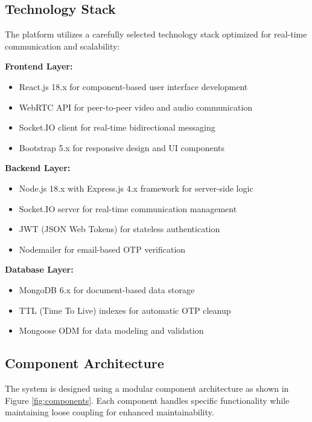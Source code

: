 \documentclass[conference]{IEEEtran}
\begin{document}
\subsection{Technology Stack}

The platform utilizes a carefully selected technology stack optimized for real-time communication and scalability:

\textbf{Frontend Layer:}
\begin{itemize}
\item React.js 18.x for component-based user interface development
\item WebRTC API for peer-to-peer video and audio communication
\item Socket.IO client for real-time bidirectional messaging
\item Bootstrap 5.x for responsive design and UI components
\end{itemize}

\textbf{Backend Layer:}
\begin{itemize}
\item Node.js 18.x with Express.js 4.x framework for server-side logic
\item Socket.IO server for real-time communication management
\item JWT (JSON Web Tokens) for stateless authentication
\item Nodemailer for email-based OTP verification
\end{itemize}

\textbf{Database Layer:}
\begin{itemize}
\item MongoDB 6.x for document-based data storage
\item TTL (Time To Live) indexes for automatic OTP cleanup
\item Mongoose ODM for data modeling and validation
\end{itemize}

\subsection{Component Architecture}

The system is designed using a modular component architecture as shown in Figure \ref{fig:components}. Each component handles specific functionality while maintaining loose coupling for enhanced maintainability.
\end{document}
